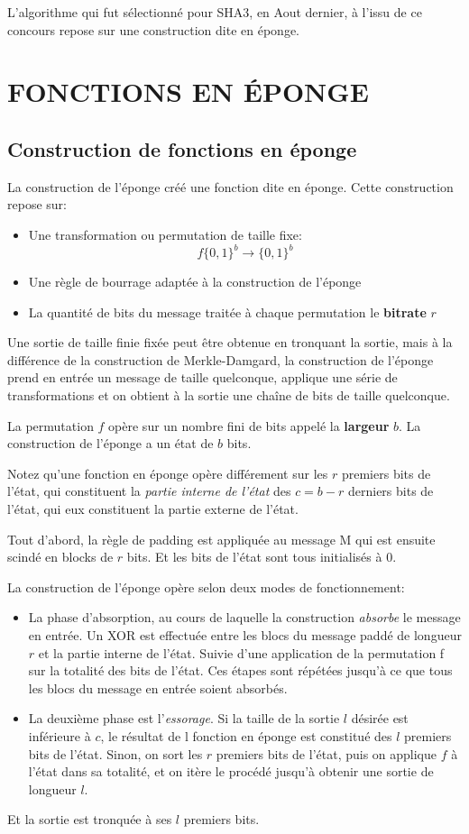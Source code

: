 \documentclass[10.5pt, a4paper, twoside, openright]{report}
\begin{document}
L'algorithme qui fut sélectionné pour SHA3, en Aout dernier, à l'issu de ce concours repose sur une construction dite en éponge. 

\chapter{FONCTIONS EN ÉPONGE}
\section{Construction de fonctions en éponge}
La construction de l'éponge créé une fonction dite en éponge. Cette construction repose sur:
\begin{itemize}
\item{Une transformation ou permutation de taille fixe:
$$f{\{0,1\}}^b \rightarrow {\{0,1\}}^b$$}
\item{Une règle de bourrage adaptée à la construction de l'éponge}
\item{La quantité de bits du message traitée à chaque permutation le \textbf{bitrate} $r$}
\end{itemize}

Une sortie de taille finie fixée peut être obtenue en tronquant la sortie, mais à la différence de la construction de Merkle-Damgard, la construction de l'éponge prend en entrée un message de taille quelconque, applique une série de transformations et on obtient à la sortie une chaîne de bits de taille quelconque.

La permutation $f$ opère sur un nombre fini de bits appelé la \textbf{largeur} $b$. La construction de l'éponge a un état de $b$ bits.

Notez qu'une fonction en éponge opère différement sur les $r$ premiers bits de l'état, qui constituent la \emph{partie interne de l'état} des $c=b-r$ derniers bits de l'état, qui eux constituent la partie externe de l'état.

Tout d'abord, la règle de padding est appliquée au message M qui est ensuite scindé en blocks de $r$ bits.
Et les bits de l'état sont tous initialisés à 0. 

La construction de l'éponge opère selon deux modes de fonctionnement:
\begin{itemize}
\item{La phase d'absorption, au cours de laquelle la construction \emph{absorbe} le message en entrée. 
Un XOR est effectuée entre les blocs du message paddé de longueur $r$ et la partie interne de l'état. Suivie d'une application de la permutation f sur la totalité des bits de l'état.
Ces étapes sont répétées jusqu'à ce que tous les blocs du message en entrée soient absorbés.}

\item{La deuxième phase est l'\emph{essorage}. Si la taille de la sortie $l$ désirée est inférieure à $c$, le résultat de l fonction en éponge est constitué des $l$ premiers bits de l'état. Sinon, on sort les $r$ premiers bits de l'état, puis on applique $f$ à l'état dans sa totalité, et on itère le procédé jusqu'à obtenir une sortie de longueur $l$.}
\end{itemize} 
Et la sortie est tronquée à ses $l$ premiers bits.
\end{document}
